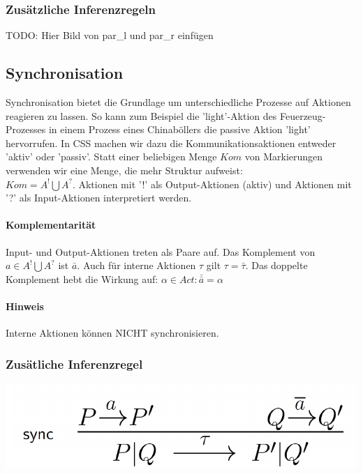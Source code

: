 \documentclass[a4paper,10pt, oneside]{book}
\begin{document}
\subsubsection{Zusätzliche Inferenzregeln}
TODO: Hier Bild von par\_l und par\_r einfügen

\subsection{Synchronisation}
Synchronisation bietet die Grundlage um unterschiedliche Prozesse auf Aktionen reagieren zu lassen. So kann zum Beispiel die 'light'-Aktion des Feuerzeug-Prozesses in einem Prozess eines Chinaböllers die passive Aktion 'light' hervorrufen.
In CSS machen wir dazu die Kommunikationsaktionen entweder 'aktiv' oder 'passiv'. Statt einer beliebigen Menge $Kom$ von Markierungen verwenden wir eine Menge, die mehr Struktur aufweist:\\
$Kom = A^! \bigcup A^?$. Aktionen mit '!' als Output-Aktionen (aktiv) und Aktionen mit '?' als Input-Aktionen interpretiert werden.


\paragraph{Komplementarität}
Input- und Output-Aktionen treten als Paare auf. Das Komplement von $a \in A^! \bigcup A^?$ ist $\bar{a}$. Auch für interne Aktionen $\tau$ gilt $\tau = \bar{\tau}$. Das doppelte Komplement hebt die Wirkung auf: $\alpha \in Act: \bar{\bar{a}} = \alpha$

\paragraph{Hinweis} Interne Aktionen können NICHT synchronisieren.

\subsubsection{Zusätliche Inferenzregel}
\begin{center}
\includegraphics[scale=0.3]{sync_regel}
\end{center}
\end{document}
